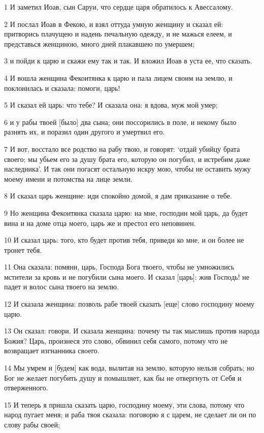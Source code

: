 \par 1 И заметил Иоав, сын Саруи, что сердце царя обратилось к Авессалому.
\par 2 И послал Иоав в Фекою, и взял оттуда умную женщину и сказал ей: притворись плачущею и надень печальную одежду, и не мажься елеем, и представься женщиною, много дней плакавшею по умершем;
\par 3 и пойди к царю и скажи ему так и так. И вложил Иоав в уста ее, что сказать.
\par 4 И вошла женщина Фекоитянка к царю и пала лицем своим на землю, и поклонилась и сказала: помоги, царь!
\par 5 И сказал ей царь: что тебе? И сказала она: я вдова, муж мой умер;
\par 6 и у рабы твоей [было] два сына; они поссорились в поле, и некому было разнять их, и поразил один другого и умертвил его.
\par 7 И вот, восстало все родство на рабу твою, и говорят: `отдай убийцу брата своего; мы убьем его за душу брата его, которую он погубил, и истребим даже наследника'. И так они погасят остальную искру мою, чтобы не оставить мужу моему имени и потомства на лице земли.
\par 8 И сказал царь женщине: иди спокойно домой, я дам приказание о тебе.
\par 9 Но женщина Фекоитянка сказала царю: на мне, господин мой царь, да будет вина и на доме отца моего, царь же и престол его неповинен.
\par 10 И сказал царь: того, кто будет против тебя, приведи ко мне, и он более не тронет тебя.
\par 11 Она сказала: помяни, царь, Господа Бога твоего, чтобы не умножились мстители за кровь и не погубили сына моего. И сказал [царь]: жив Господь! не падет и волос сына твоего на землю.
\par 12 И сказала женщина: позволь рабе твоей сказать [еще] слово господину моему царю.
\par 13 Он сказал: говори. И сказала женщина: почему ты так мыслишь против народа Божия? Царь, произнеся это слово, обвинил себя самого, потому что не возвращает изгнанника своего.
\par 14 Мы умрем и [будем] как вода, вылитая на землю, которую нельзя собрать; но Бог не желает погубить душу и помышляет, как бы не отвергнуть от Себя и отверженного.
\par 15 И теперь я пришла сказать царю, господину моему, эти слова, потому что народ пугает меня; и раба твоя сказала: поговорю я с царем, не сделает ли он по слову рабы своей;
